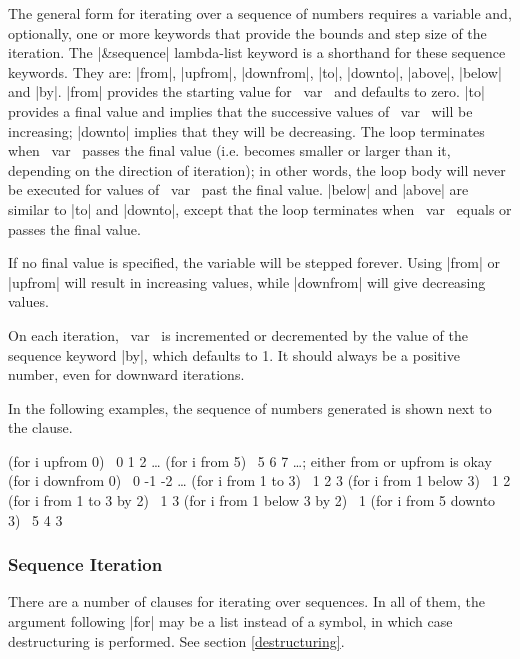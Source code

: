 \begin{clauses}
The general form for iterating over a sequence of numbers requires a
variable and, optionally, one or more keywords that provide the bounds
and step size of the iteration. The |\&sequence|
lambda-list keyword is a shorthand for these sequence keywords.  They are:
|from|, |upfrom|, |downfrom|, |to|, |downto|, |above|, |below| and |by|.
|from| provides the starting value for ~var~
and defaults to zero. |to| provides a final value and implies that the
successive values of ~var~ will be increasing; |downto| implies that
they will be decreasing.  The loop terminates when ~var~ passes
the final value (i.e. becomes smaller or larger than it, depending on
the direction of iteration); in other  words, the loop body
will never be 
executed for values of ~var~ past the final value.
|below| and |above| are similar to |to| and
|downto|, except that the loop terminates when ~var~ equals or passes
the final value.

\cpar If no final value is specified, the variable will be stepped
forever.  Using |from| or |upfrom| will result in increasing
values, while |downfrom| will give decreasing values.

\cpar On each iteration,
~var~ is incremented or decremented by the value of the sequence
keyword |by|, which defaults to 1.  It should always be a positive
number, even for downward iterations.

\cpar In the following examples, the sequence of numbers generated is shown
next to the clause.

\begin{program}
(for i upfrom 0) \yields\ 0 1 2 \ldots
(for i from 5)   \yields\ 5 6 7 \ldots    ; either from or upfrom is okay
(for i downfrom 0) \yields\ 0 -1 -2 \ldots
(for i from 1 to 3) \yields\ 1 2 3
(for i from 1 below 3) \yields\ 1 2
(for i from 1 to 3 by 2) \yields\ 1 3
(for i from 1 below 3 by 2) \yields\ 1
(for i from 5 downto 3) \yields\ 5 4 3
\end{program}

\end{clauses}

\subsubsection{Sequence Iteration}

There are a number of clauses for iterating over sequences.  In all of
them, the argument following |for| may be a list instead of a
symbol, in which case destructuring is performed.  See section
\ref{destructuring}. 

